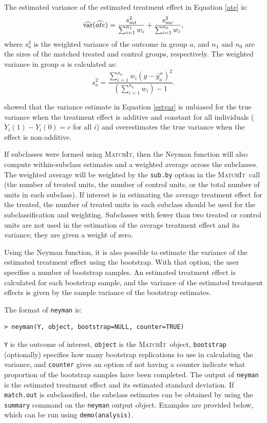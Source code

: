 \documentclass[oneside,letterpaper,titlepage]{article}
\newcommand{\MatchIt}{\textsc{MatchIt}}
\begin{document}
The estimated variance of the estimated treatment effect in Equation
\eqref{ate} is:
\begin{equation}
\label{estvar}
\widehat{{\rm var}}(\widehat{ate}) = \frac{s_{mt}^2}{\sum_{i=1}^{n_1} w_i} + \frac{s_{mc}^2}{\sum_{i=1}^{n_0} w_i},
\end{equation}
where $s_a^2$ is the weighted variance of the outcome in group $a$,
and $n_1$ and $n_0$ are the sizes of the matched treated and control
groups, respectively.  The weighted variance in group $a$ is
calculated as:
$$s^2_{a} = \frac{\sum_{i=1}^{n_a} w_i
  (y-\overline{y}_a^w)^2}{(\sum_{i=1}^{n_a} w_i) - 1}.$$

\cite{Neyman23} showed that the variance estimate in Equation
\eqref{estvar} is unbiased for the true variance when the treatment
effect is additive and constant for all individuals ($Y_i(1)-Y_i(0)=c$
for all $i$) and overestimates the true variance when the effect is
non-additive.

If subclasses were formed using \MatchIt, then the Neyman function
will also compute within-subclass estimates and a weighted average
across the subclasses.  The weighted average will be weighted by the
{\tt sub.by} option in the \MatchIt\ call (the number of treated units,
the number of control units, or the total number of units in each
subclass).  If interest is in estimating the average treatment effect
for the treated, the number of treated units in each subclass should
be used for the subclassification and weighting.  Subclasses with
fewer than two treated or control units are not used in the estimation
of the average treatment effect and its variance; they are given a
weight of zero.

Using the Neyman function, it is also possible to estimate the
variance of the estimated treatment effect using the bootstrap.  With
that option, the user specifies a number of bootstrap samples.  An
estimated treatment effect is calculated for each bootstrap sample,
and the variance of the estimated treatment effects is given by the
sample variance of the bootstrap estimates.  

The format of {\tt neyman} is:

\begin{verbatim}
> neyman(Y, object, bootstrap=NULL, counter=TRUE)
\end{verbatim}

{\tt Y} is the outcome of interest, {\tt object} is the \MatchIt\ 
object, {\tt bootstrap} (optionally) specifies how many bootstrap
replications to use in calculating the variance, and {\tt counter}
gives an option of not having a counter indicate what proportion of
the bootstrap samples have been completed.  The output of {\tt neyman}
is the estimated treatment effect and its estimated standard
deviation.  If {\tt match.out} is subclassified, the subclass
estimates can be obtained by using the {\tt summary} command on the
{\tt neyman} output object.  Examples are provided below, which can be
run using {\tt demo(analysis)}.
\end{document}
